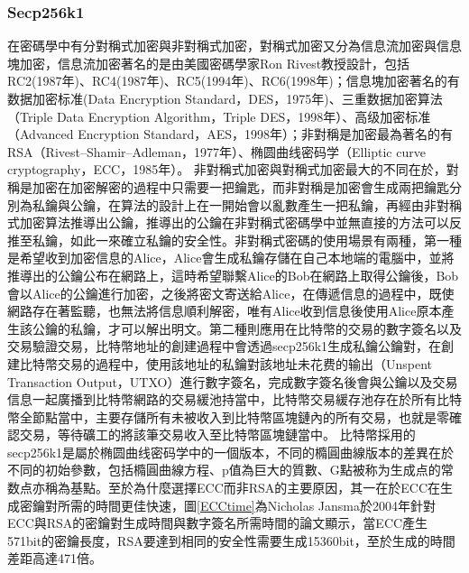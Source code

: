 			\subsubsection{Secp256k1}
			在密碼學中有分對稱式加密與非對稱式加密，對稱式加密又分為信息流加密與信息塊加密，信息流加密著名的是由美國密碼學家Ron Rivest教授設計，包括RC2(1987年)\supercite{OnthedesignandsecurityofRC2}、RC4(1987年)\supercite{Rc4}、RC5(1994年)\supercite{TheRC5encryptionalgorithm}、RC6(1998年)\supercite{TheRC6blockcipher.v1.1August201998}；信息塊加密著名的有数据加密标准(Data Encryption Standard，DES，1975年)\supercite{Dataencryptionstandard}、三重数据加密算法（Triple Data Encryption Algorithm，Triple DES，1998年）\supercite{TrippleDataEncryptionAlgorithmModesofOperation}、高级加密标准（Advanced Encryption Standard，AES，1998年）\supercite{ThedesignofRijndael:AES-theadvancedencryptionstandard}；非對稱是加密最為著名的有RSA（Rivest–Shamir–Adleman，1977年）\supercite{Cryptographiccommunicationssystemandmethod}、椭圆曲线密码学（Elliptic curve cryptography，ECC，1985年）\supercite{Ellipticcurvecryptosystems}。
			非對稱式加密與對稱式加密最大的不同在於，對稱是加密在加密解密的過程中只需要一把鑰匙，而非對稱是加密會生成兩把鑰匙分別為私鑰與公鑰，在算法的設計上在一開始會以亂數產生一把私鑰，再經由非對稱式加密算法推導出公鑰，推導出的公鑰在非對稱式密碼學中並無直接的方法可以反推至私鑰，如此一來確立私鑰的安全性。非對稱式密碼的使用場景有兩種，第一種是希望收到加密信息的Alice，Alice會生成私鑰存儲在自己本地端的電腦中，並將推導出的公鑰公布在網路上，這時希望聯繫Alice的Bob在網路上取得公鑰後，Bob會以Alice的公鑰進行加密，之後將密文寄送給Alice，在傳遞信息的過程中，既使網路存在著監聽，也無法將信息順利解密，唯有Alice收到信息後使用Alice原本產生該公鑰的私鑰，才可以解出明文。第二種則應用在比特幣的交易的數字簽名以及交易驗證交易，比特幣地址的創建過程中會透過secp256k1生成私鑰公鑰對，在創建比特幣交易的過程中，使用該地址的私鑰對該地址未花费的输出（Unspent Transaction Output，UTXO）進行數字簽名，完成數字簽名後會與公鑰以及交易信息一起廣播到比特幣網路的交易緩池持當中，比特幣交易緩存池存在於所有比特幣全節點當中，主要存儲所有未被收入到比特幣區塊鏈內的所有交易，也就是零確認交易，等待礦工的將該筆交易收入至比特幣區塊鏈當中。
			比特幣採用的secp256k1是屬於椭圆曲线密码学中的一個版本，不同的橢圓曲線版本的差異在於不同的初始參數，包括橢圓曲線方程、p值為巨大的質數、G點被称为⽣成点的常数点亦稱為基點。至於為什麼選擇ECC而非RSA的主要原因，其一在於ECC在生成密鑰對所需的時間更佳快速，圖\ref{ECCtime}為Nicholas Jansma於2004年針對ECC與RSA的密鑰對生成時間與數字簽名所需時間的論文\supercite{Performancecomparisonofellipticcurveandrsadigitalsignatures}顯示，當ECC產生571bit的密鑰長度，RSA要達到相同的安全性需要生成15360bit，至於生成的時間差距高達471倍。
			
